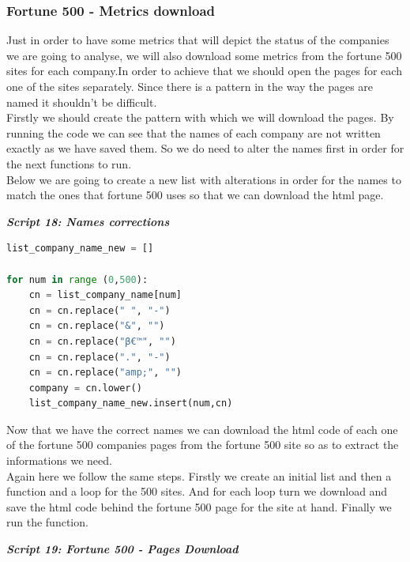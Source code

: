 \documentclass{article}
\begin{document}
\subsubsection{Fortune 500 - Metrics download}
Just in order to have some metrics that will depict the status of the companies we are going to analyse, we will also download some metrics from the fortune 500 sites for each company.In order to achieve that we should open the pages for each one of the sites separately. Since there is a pattern in the way the pages are named it shouldn't be difficult.\\
Firstly we should create the pattern with which we will download the pages. By running the code we can see that the names of each company are not written exactly as we have saved them. So we do need to alter the names first in order for the next functions to run.\\
Below we are going to create a new list with alterations in order for the names to match the ones that fortune 500 uses so that we can download the html page.\\
\begin{center}
\textit{\textbf{Script 18: Names corrections}}
\end{center}
\begin{lstlisting}[language=Python]
list_company_name_new = []

for num in range (0,500):
    cn = list_company_name[num]
    cn = cn.replace(" ", "-")
    cn = cn.replace("&", "")
    cn = cn.replace("β€™", "")
    cn = cn.replace(".", "-")
    cn = cn.replace("amp;", "")    
    company = cn.lower()
    list_company_name_new.insert(num,cn)
\end{lstlisting}     
Now that we have the correct names we can download the html code of each one of the fortune 500 companies pages from the fortune 500 site so as to extract the informations we need.\\
Again here we follow the same steps. Firstly we create an initial list and then a function and a loop for the 500 sites. And for each loop turn we download and save the html code behind the fortune 500 page for the site at hand. Finally we run the function.
\begin{center}
\textit{\textbf{Script 19: Fortune 500 - Pages Download}}
\end{center}
\end{document}

